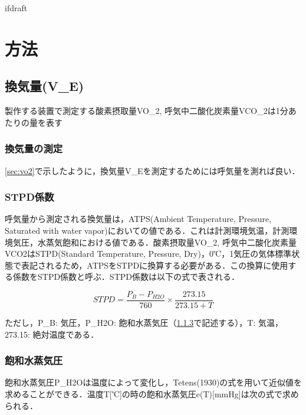 \expandafter\ifx\csname ifdraft\endcsname\relax
 
\fi

\section{方法}
\label{sec:method}

\subsection{換気量(V_E)}

製作する装置で測定する酸素摂取量VO_2, 呼気中二酸化炭素量VCO_2は1分あたりの量を表す

\subsubsection{換気量の測定}

\ref{sec:vo2}で示したように，換気量V_Eを測定するためには呼気量を測れば良い．



\subsubsection{STPD係数}
\label{sec:stpd}

呼気量から測定される換気量は，ATPS(Ambient Temperature, Pressure, Saturated with water vapor)においての値である．これは計測環境気温，計測環境気圧，水蒸気飽和における値である．酸素摂取量VO_2, 呼気中二酸化炭素量VCO2はSTPD(Standard Temperature, Pressure, Dry)，0℃，1気圧の気体標準状態で表記されるため，ATPSをSTPDに換算する必要がある．この換算に使用する係数をSTPD係数と呼ぶ．STPD係数は以下の式で表される．

\begin{equation}
  \label{eq:stpd}
  STPD = \frac{P_B - P_{H2O}}{760} \times　\frac{273.15}{273.15 + T}
\end{equation}

ただし，P_B: 気圧，P_{H2O}: 飽和水蒸気圧（\ref{sec:swvp}で記述する），T: 気温，273.15: 絶対温度である．

\subsubsection{飽和水蒸気圧}
\label{sec:swvp}

飽和水蒸気圧P_{H2O}は温度によって変化し，Tetens(1930)の式を用いて近似値を求めることができる．温度T[℃]の時の飽和水蒸気圧e(T)[mmHg]は次の式で求められる．

